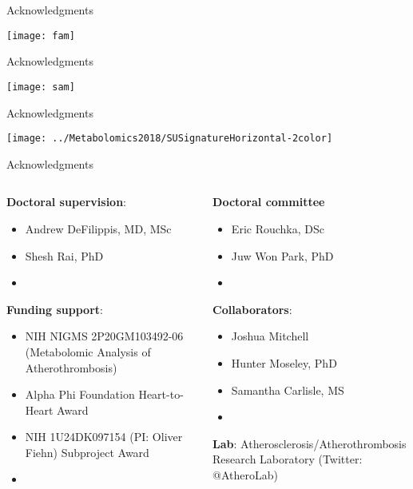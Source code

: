 \documentclass[xcolor=dvipsnames]{beamer}
\begin{document}
\begin{frame}{Acknowledgments}
	\vspace{-5.5pt}
	\begin{center}
		\texttt{[image: fam]}
	\end{center}
\end{frame}

\begin{frame}{Acknowledgments}
	\vspace{-5.5pt}
	\begin{center}
		\texttt{[image: sam]}
	\end{center}
\end{frame}

\begin{frame}{Acknowledgments}
	\vspace{-15.5pt}
	\begin{center}
		\texttt{[image: ../Metabolomics2018/SUSignatureHorizontal-2color]}
	\end{center}
\end{frame}

\begin{frame}{Acknowledgments}
	\begin{columns}
		\begin{column}{0.5\textwidth}
			\textbf{Doctoral supervision}:
			\begin{itemize}
				\item Andrew DeFilippis, MD, MSc
				\item Shesh Rai, PhD
				\item[]
			\end{itemize}
			\textbf{Funding support}:
			\begin{itemize}
				\item NIH NIGMS 2P20GM103492-06 (Metabolomic Analysis of Atherothrombosis)
				\item Alpha Phi Foundation Heart-to-Heart Award
				\item NIH 1U24DK097154 (PI: Oliver Fiehn) Subproject Award
				\item[]
			\end{itemize}
		\end{column}
		\vspace{-25.5pt}
		\begin{column}{0.5\textwidth}
			\textbf{Doctoral committee }
			\begin{itemize}
				\item Eric Rouchka, DSc
				\item Juw Won Park, PhD
				\item[]
			\end{itemize}
			\textbf{Collaborators}:
			\begin{itemize}
				\item Joshua Mitchell 
				\item Hunter Moseley, PhD
				\item Samantha Carlisle, MS
				\item[]
			\end{itemize}
			\textbf{Lab}: Atherosclerosis/Atherothrombosis Research Laboratory (Twitter: @AtheroLab)
		\end{column}
	\end{columns}
\end{frame}
\end{document}
